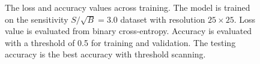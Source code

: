 \documentclass[12pt]{article}
\begin{document}
\begin{figure}[htpb]
{                } 
                \caption{The loss and accuracy values across training. The model is trained on the sensitivity $S / \sqrt{B} = 3.0$ dataset with resolution $25\times 25$. Loss value is evaluated from binary cross-entropy. Accuracy is evaluated with a threshold of 0.5 for training and validation. The testing accuracy is the best accuracy with threshold scanning.}
                \label{fig:loss_acc_across_training_SB_3_res_25}
            \end{figure}
\end{document}
